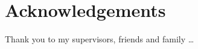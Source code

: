 \chapter*{\centering Acknowledgements}
\noindent 
Thank you to my supervisors, friends and family \ldots
\newpage